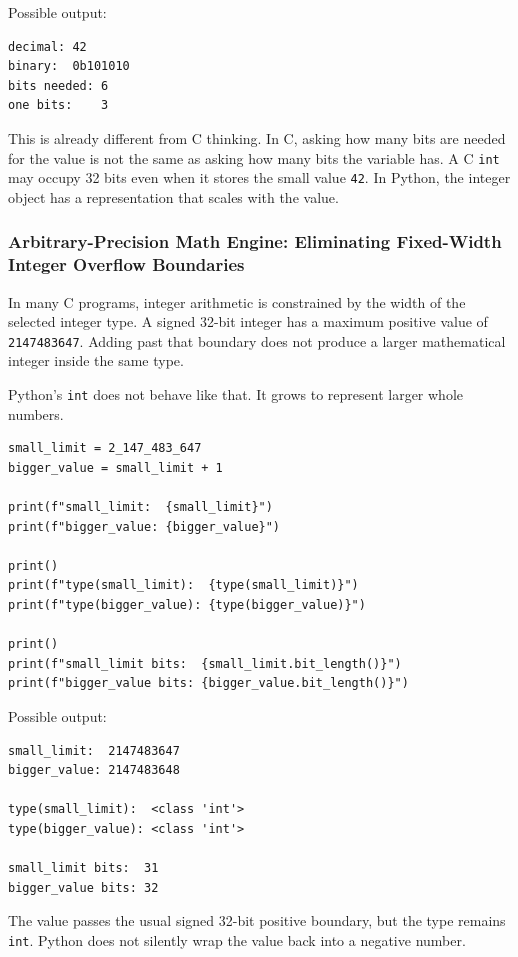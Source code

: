 Possible output:

\begin{verbatim}
decimal: 42
binary:  0b101010
bits needed: 6
one bits:    3
\end{verbatim}

This is already different from C thinking. In C, asking how many bits are needed for the value is not the same as asking how many bits the variable has. A C \texttt{int} may occupy 32 bits even when it stores the small value \texttt{42}. In Python, the integer object has a representation that scales with the value.

\subsubsection{Arbitrary-Precision Math Engine: Eliminating Fixed-Width Integer Overflow Boundaries}

In many C programs, integer arithmetic is constrained by the width of the selected integer type. A signed 32-bit integer has a maximum positive value of \texttt{2147483647}. Adding past that boundary does not produce a larger mathematical integer inside the same type.

Python's \texttt{int} does not behave like that. It grows to represent larger whole numbers.

\begin{verbatim}
small_limit = 2_147_483_647
bigger_value = small_limit + 1

print(f"small_limit:  {small_limit}")
print(f"bigger_value: {bigger_value}")

print()
print(f"type(small_limit):  {type(small_limit)}")
print(f"type(bigger_value): {type(bigger_value)}")

print()
print(f"small_limit bits:  {small_limit.bit_length()}")
print(f"bigger_value bits: {bigger_value.bit_length()}")
\end{verbatim}

Possible output:

\begin{verbatim}
small_limit:  2147483647
bigger_value: 2147483648

type(small_limit):  <class 'int'>
type(bigger_value): <class 'int'>

small_limit bits:  31
bigger_value bits: 32
\end{verbatim}

The value passes the usual signed 32-bit positive boundary, but the type remains \texttt{int}. Python does not silently wrap the value back into a negative number.

